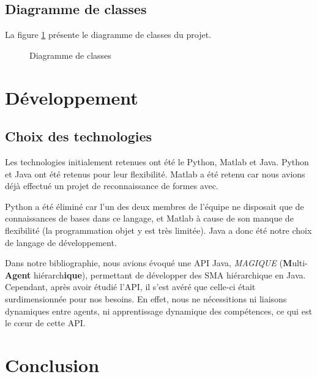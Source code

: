 \documentclass[a4paper,12pt]{report}
\begin{document}
\section{Diagramme de classes}
La figure \ref{fig:dc} présente le diagramme de classes du projet.
\begin{figure}
 \caption{Diagramme de classes}
 \label{fig:dc}
\end{figure}


\chapter{Développement}
\section{Choix des technologies}
Les technologies initialement retenues ont été le Python, Matlab et Java. Python et Java ont été retenus pour leur flexibilité. Matlab a été retenu car nous avions déjà effectué un projet de reconnaissance de formes avec.

Python a été éliminé car l'un des deux membres de l'équipe ne disposait que de connaissances de bases dans ce langage, et Matlab à cause de son manque de flexibilité (la programmation objet y est très limitée). Java a donc été notre choix de langage de développement.

Dans notre bibliographie, nous avions évoqué une API Java, \emph{MAGIQUE} (\textbf{M}ulti-\textbf{Agent} hiérarch\textbf{ique}), permettant de développer des SMA hiérarchique en Java. Cependant, après avoir étudié l'API, il s'est avéré que celle-ci était surdimensionnée pour nos besoins. En effet, nous ne nécessitions ni liaisons dynamiques entre agents, ni apprentissage dynamique des compétences, ce qui est le cœur de cette API. 



\chapter{Conclusion}
\end{document}
